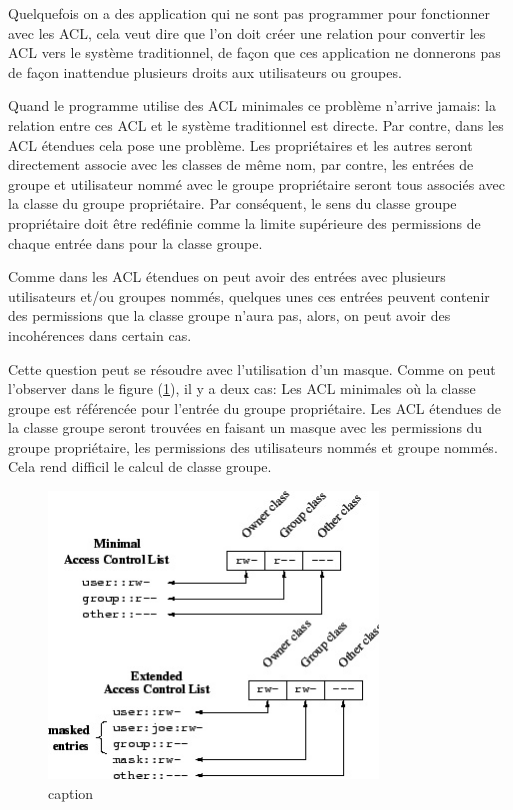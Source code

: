 Quelquefois on a des application qui ne sont pas programmer pour fonctionner avec les ACL, cela veut dire que l'on doit créer une relation pour convertir les ACL vers le système traditionnel, de façon que ces application ne donnerons pas de façon inattendue plusieurs droits aux utilisateurs ou groupes. 

Quand le programme utilise des ACL minimales ce problème n'arrive jamais: la relation entre ces ACL et le système traditionnel est directe. Par contre, dans les ACL étendues cela pose une problème. Les propriétaires et les autres seront directement associe avec les classes de même nom, par contre, les entrées de groupe et utilisateur nommé avec le groupe propriétaire seront tous associés avec la classe du groupe propriétaire. Par conséquent, le sens du classe groupe propriétaire doit être redéfinie comme la limite supérieure des permissions de chaque entrée dans pour la classe groupe.

Comme dans les ACL étendues on peut avoir des entrées avec plusieurs utilisateurs et/ou groupes nommés, quelques unes ces entrées peuvent contenir des permissions que la classe groupe n'aura pas, alors, on peut avoir des incohérences dans certain cas. 


Cette question peut se résoudre avec l'utilisation d'un masque. Comme on peut l'observer dans le figure (\ref{fig:img_acl-mapping}), il y a deux cas:  Les ACL minimales où la classe groupe est référencée pour l'entrée du groupe propriétaire. Les ACL étendues de la classe groupe seront trouvées en faisant un masque avec les permissions du groupe propriétaire, les permissions des utilisateurs nommés et groupe nommés. Cela rend difficil le calcul de classe groupe. 

\begin{figure}[htbp]
\centering
\includegraphics[height=3in]{img/acl-mapping.jpg}
\caption{caption}
\label{fig:img_acl-mapping}
\end{figure}
 
